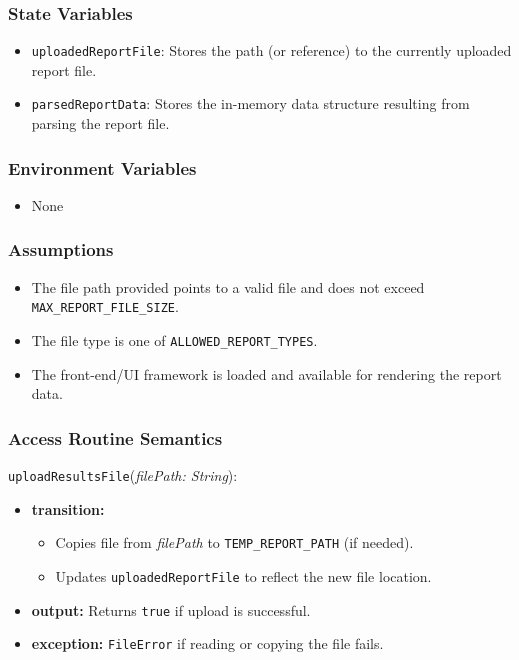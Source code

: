 \documentclass[12pt, titlepage]{article}
\begin{document}
\subsubsection{State Variables}

\begin{itemize}
    \item \texttt{uploadedReportFile}: Stores the path (or reference) to the currently uploaded report file.
    \item \texttt{parsedReportData}: Stores the in-memory data structure resulting from parsing the report file.
\end{itemize}

\subsubsection{Environment Variables}

\begin{itemize}
    \item None
\end{itemize}

\subsubsection{Assumptions}

\begin{itemize}
    \item The file path provided points to a valid file and does not exceed \texttt{MAX\_REPORT\_FILE\_SIZE}.
    \item The file type is one of \texttt{ALLOWED\_REPORT\_TYPES}.
    \item The front-end/UI framework is loaded and available for rendering the report data.
\end{itemize}

\subsubsection{Access Routine Semantics}

\noindent \texttt{uploadResultsFile}(\textit{filePath: String}):
\begin{itemize}
    \item \textbf{transition:}
    \begin{itemize}
        \item Copies file from \textit{filePath} to \texttt{TEMP\_REPORT\_PATH} (if needed).
        \item Updates \texttt{uploadedReportFile} to reflect the new file location.
    \end{itemize}
    \item \textbf{output:} Returns \texttt{true} if upload is successful.
    \item \textbf{exception:} \texttt{FileError} if reading or copying the file fails.
\end{itemize}
\end{document}
